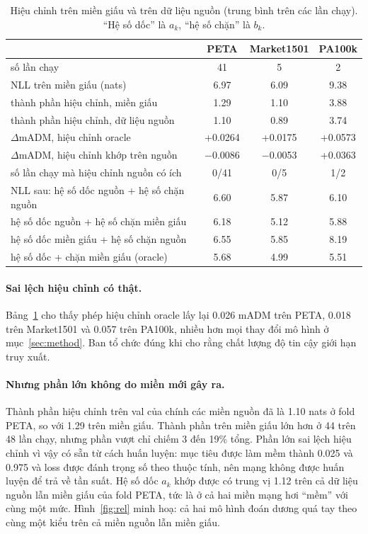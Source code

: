 \documentclass[11pt,a4paper]{article}
\begin{document}
\begin{table}[H]
\centering\small
\begin{tabular}{@{}lccc@{}}
\toprule
& PETA & Market1501 & PA100k \\
\midrule
số lần chạy & 41 & 5 & 2 \\
NLL trên miền giấu (nats) & 6.97 & 6.09 & 9.38 \\
thành phần hiệu chỉnh, miền giấu & 1.29 & 1.10 & 3.88 \\
thành phần hiệu chỉnh, dữ liệu nguồn & 1.10 & 0.89 & 3.74 \\
\midrule
$\Delta$mADM, hiệu chỉnh oracle & +0.0264 & +0.0175 & +0.0573 \\
$\Delta$mADM, hiệu chỉnh khớp trên nguồn & $-$0.0086 & $-$0.0053 & +0.0363 \\
số lần chạy mà hiệu chỉnh nguồn có ích & 0/41 & 0/5 & 1/2 \\
\midrule
NLL sau: hệ số dốc nguồn + hệ số chặn nguồn & 6.60 & 5.87 & 6.10 \\
\phantom{NLL sau:} hệ số dốc nguồn + hệ số chặn miền giấu & 6.18 & 5.12 & 5.88 \\
\phantom{NLL sau:} hệ số dốc miền giấu + hệ số chặn nguồn & 6.55 & 5.85 & 8.19 \\
\phantom{NLL sau:} hệ số dốc + chặn miền giấu (oracle) & 5.68 & 4.99 & 5.51 \\
\bottomrule
\end{tabular}
\caption{Hiệu chỉnh trên miền giấu và trên dữ liệu nguồn (trung bình trên các lần chạy). ``Hệ số dốc'' là $a_k$, ``hệ số chặn'' là $b_k$.}
\label{tab:calib}
\end{table}

\paragraph{Sai lệch hiệu chỉnh có thật.} Bảng~\ref{tab:calib} cho thấy phép hiệu chỉnh oracle lấy lại 0.026 mADM trên PETA, 0.018 trên Market1501 và 0.057 trên PA100k, nhiều hơn mọi thay đổi mô hình ở mục~\ref{sec:method}. Ban tổ chức đúng khi cho rằng chất lượng độ tin cậy giới hạn truy xuất.

\paragraph{Nhưng phần lớn không do miền mới gây ra.} Thành phần hiệu chỉnh trên val của chính các miền nguồn đã là 1.10 nats ở fold PETA, so với 1.29 trên miền giấu. Thành phần trên miền giấu lớn hơn ở 44 trên 48 lần chạy, nhưng phần vượt chỉ chiếm 3 đến 19\% tổng. Phần lớn sai lệch hiệu chỉnh vì vậy có sẵn từ cách huấn luyện: mục tiêu được làm mềm thành 0.025 và 0.975 và loss được đánh trọng số theo thuộc tính, nên mạng không được huấn luyện để trả về tần suất. Hệ số dốc $a_k$ khớp được có trung vị 1.12 trên cả dữ liệu nguồn lẫn miền giấu của fold PETA, tức là ở cả hai miền mạng hơi ``mềm'' với cùng một mức. Hình~\ref{fig:rel} minh hoạ: cả hai mô hình đoán dương quá tay theo cùng một kiểu trên cả miền nguồn lẫn miền giấu.
\end{document}
